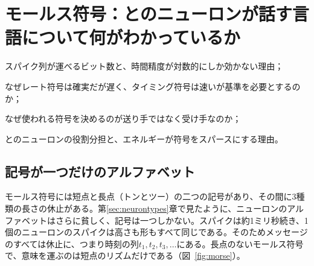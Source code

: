 \chapter{モールス符号：とのニューロンが話す言語について何がわかっているか}
\label{sec:code}
\begin{chaptergoals}
\item スパイク列が運べるビット数と、時間精度が対数的にしか効かない理由；
\item なぜレート符号は確実だが遅く、タイミング符号は速いが基準を必要とするのか；
\item なぜ使われる符号を決めるのが送り手ではなく受け手なのか；
\item {}とのニューロンの役割分担と、エネルギーが符号をスパースにする理由。
\end{chaptergoals}

\section{記号が一つだけのアルファベット}

モールス符号には短点と長点（トンとツー）の二つの記号があり、その間に3種類の長さの休止がある。第\ref{sec:neurontypes}章で見たように、ニューロンのアルファベットはさらに貧しく、記号は一つしかない。スパイクは約1ミリ秒続き、1個のニューロンのスパイクは高さも形もすべて同じである。そのためメッセージのすべては休止に、つまり時刻の列$t_1,t_2,t_3,\dots$にある。長点のないモールス符号で、意味を運ぶのは短点のリズムだけである（図~\ref{fig:morse}）。

